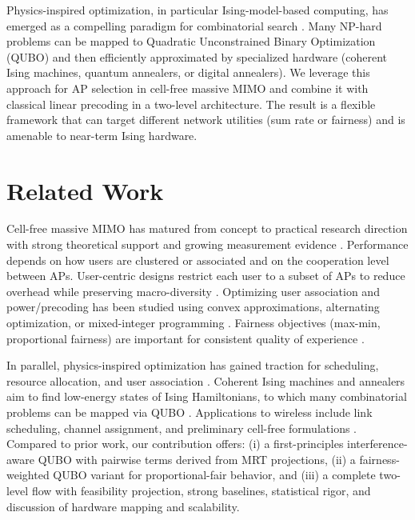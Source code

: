 {Physics-inspired optimization, in particular Ising-model-based computing, has emerged as a compelling paradigm for combinatorial search \cite{lucas2014ising,mcmahon2016fully,inagaki2016coherent,kasi2021resource,grassl2022ising}. Many NP-hard problems can be mapped to Quadratic Unconstrained Binary Optimization (QUBO) and then efficiently approximated by specialized hardware (coherent Ising machines, quantum annealers, or digital annealers). We leverage this approach for AP selection in cell-free massive MIMO and combine it with classical linear precoding in a two-level architecture. The result is a flexible framework that can target different network utilities (sum rate or fairness) and is amenable to near-term Ising hardware.

\section{Related Work}


Cell-free massive MIMO has matured from concept to practical research direction with strong theoretical support and growing measurement evidence \cite{ngo2017cell,demir2021foundations,bjornson2019massive}. Performance depends on how users are clustered or associated and on the cooperation level between APs. User-centric designs restrict each user to a subset of APs to reduce overhead while preserving macro-diversity \cite{buzzi2019user,chen2020structured}. Optimizing user association and power/precoding has been studied using convex approximations, alternating optimization, or mixed-integer programming \cite{nayebi2017precoding,bjornson2019making}. Fairness objectives (max-min, proportional fairness) are important for consistent quality of experience \cite{bashar2021max}.

In parallel, physics-inspired optimization has gained traction for scheduling, resource allocation, and user association \cite{kasi2021resource,grassl2022ising}. Coherent Ising machines and annealers aim to find low-energy states of Ising Hamiltonians, to which many combinatorial problems can be mapped via QUBO \cite{lucas2014ising,mcmahon2016fully,inagaki2016coherent,glover2018tutorial}. Applications to wireless include link scheduling, channel assignment, and preliminary cell-free formulations \cite{zhao2022joint}. Compared to prior work, our contribution offers: (i) a first-principles interference-aware QUBO with pairwise terms derived from MRT projections, (ii) a fairness-weighted QUBO variant for proportional-fair behavior, and (iii) a complete two-level flow with feasibility projection, strong baselines, statistical rigor, and discussion of hardware mapping and scalability.

}
